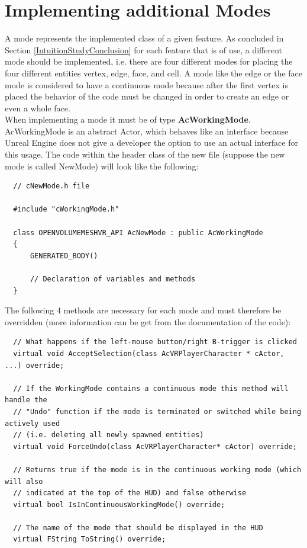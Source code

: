 \documentclass{report}
\begin{document}
	\section{Implementing additional Modes}
	\startsection
		A mode represents the implemented class of a given feature. As concluded in Section \ref{IntuitionStudyConclusion} for each feature that is of use, a different mode should be implemented, i.e. there are four different modes for placing the four different entities vertex, edge, face, and cell. A mode like the edge or the face mode is considered to have a continuous mode because after the first vertex is placed the behavior of the code must be changed in order to create an edge or even a whole face. \\
		When implementing a mode it must be of type \textbf{AcWorkingMode}. AcWorkingMode is an abstract Actor, which behaves like an interface because Unreal Engine does not give a developer the option to use an actual interface for this usage. The code within the header class of the new file (suppose the new mode is called NewMode) will look like the following:
		\begin{verbatim}
  // cNewMode.h file		

  #include "cWorkingMode.h"		
		
  class OPENVOLUMEMESHVR_API AcNewMode : public AcWorkingMode
  {
      GENERATED_BODY()
				
      // Declaration of variables and methods
  }
		\end{verbatim}
		The following 4 methods are necessary for each mode and must therefore be overridden (more information can be get from the documentation of the code):
		\begin{verbatim}
  // What happens if the left-mouse button/right B-trigger is clicked
  virtual void AcceptSelection(class AcVRPlayerCharacter * cActor, ...) override;

  // If the WorkingMode contains a continuous mode this method will handle the
  // "Undo" function if the mode is terminated or switched while being actively used
  // (i.e. deleting all newly spawned entities)
  virtual void ForceUndo(class AcVRPlayerCharacter* cActor) override;

  // Returns true if the mode is in the continuous working mode (which will also
  // indicated at the top of the HUD) and false otherwise
  virtual bool IsInContinuousWorkingMode() override;

  // The name of the mode that should be displayed in the HUD
  virtual FString ToString() override;
		\end{verbatim}
\end{document}
